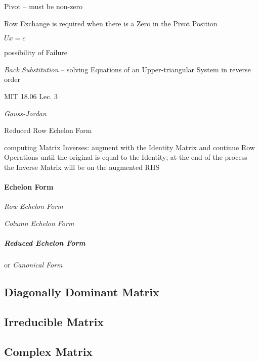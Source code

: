 Pivot -- must be non-zero

Row Exchange is required when there is a Zero in the Pivot Position

$Ux = c$

possibility of Failure

\emph{Back Substitution} -- solving Equations of an Upper-triangular System in
reverse order


MIT 18.06 Lec. 3

\emph{Gauss-Jordan}

Reduced Row Echelon Form

computing Matrix Inverses: augment with the Identity Matrix and continue Row
Operations until the original is equal to the Identity; at the end of the
process the Inverse Matrix will be on the augmented RHS



\paragraph{Echelon Form}\label{sec:echelon_form}\hfill

\emph{Row Echelon Form}

\emph{Column Echelon Form}



\subparagraph{Reduced Echelon Form}\label{sec:reduced_echelon}\hfill

or \emph{Canonical Form}



\subsection{Diagonally Dominant Matrix}\label{sec:diagonally_dominant}

\subsection{Irreducible Matrix}\label{sec:irreducible_matrix}

\subsection{Complex Matrix}\label{sec:complex_matrix}

